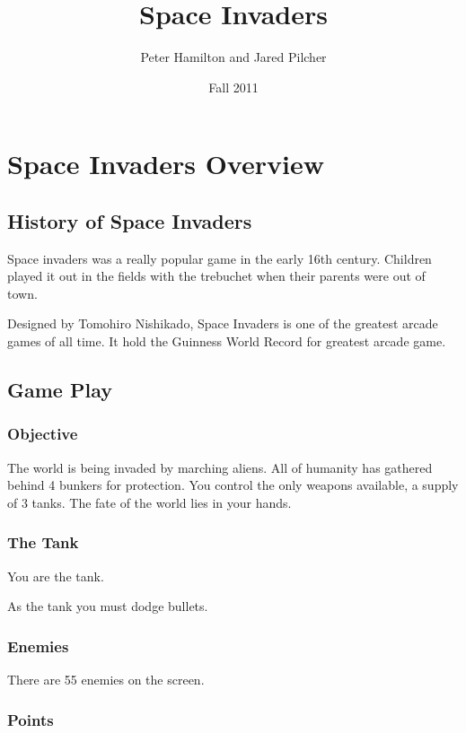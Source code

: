 \documentclass[11pt,letter,oneside]{report}
\begin{document}
\title{Space Invaders}
\author{Peter Hamilton and Jared Pilcher}
\date{Fall 2011}
\maketitle

\tableofcontents

\chapter{Space Invaders Overview}
\section{History of Space Invaders}

Space invaders was a really popular game in the early 16th century.  Children played it out in the fields with the trebuchet when their parents were out of town.

Designed by Tomohiro Nishikado, Space Invaders is one of the greatest arcade games of all time.  It hold the Guinness World Record for greatest arcade game.
 

\section{Game Play}

\subsection{Objective}

The world is being invaded by marching aliens.  All of humanity has gathered behind 4 bunkers for protection.  You control the only weapons available, a supply of 3 tanks.  The fate of the world lies in your hands.

\subsection{The Tank}

You are the tank.

As the tank you must dodge bullets.

\subsection{Enemies}

There are 55 enemies on the screen.

\subsection{Points}
\end{document}

